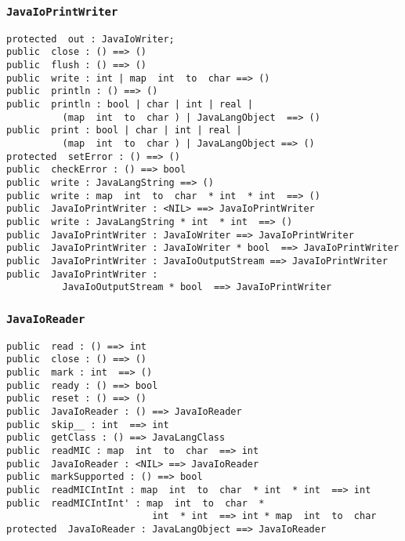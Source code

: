 \documentclass[\pformat,12pt]{article}
\begin{document}
\subsubsection{\texttt{JavaIoPrintWriter}}
\begin{small}
\begin{verbatim}
protected  out : JavaIoWriter;
public  close : () ==> ()
public  flush : () ==> ()
public  write : int | map  int  to  char ==> ()
public  println : () ==> ()
public  println : bool | char | int | real | 
          (map  int  to  char ) | JavaLangObject  ==> ()
public  print : bool | char | int | real | 
          (map  int  to  char ) | JavaLangObject ==> ()
protected  setError : () ==> ()
public  checkError : () ==> bool
public  write : JavaLangString ==> ()
public  write : map  int  to  char  * int  * int  ==> ()
public  JavaIoPrintWriter : <NIL> ==> JavaIoPrintWriter
public  write : JavaLangString * int  * int  ==> ()
public  JavaIoPrintWriter : JavaIoWriter ==> JavaIoPrintWriter
public  JavaIoPrintWriter : JavaIoWriter * bool  ==> JavaIoPrintWriter
public  JavaIoPrintWriter : JavaIoOutputStream ==> JavaIoPrintWriter
public  JavaIoPrintWriter : 
          JavaIoOutputStream * bool  ==> JavaIoPrintWriter
\end{verbatim}
\end{small}

\subsubsection{\texttt{JavaIoReader}}
\begin{small}
\begin{verbatim}
public  read : () ==> int
public  close : () ==> ()
public  mark : int  ==> ()
public  ready : () ==> bool
public  reset : () ==> ()
public  JavaIoReader : () ==> JavaIoReader
public  skip__ : int  ==> int
public  getClass : () ==> JavaLangClass
public  readMIC : map  int  to  char  ==> int
public  JavaIoReader : <NIL> ==> JavaIoReader
public  markSupported : () ==> bool
public  readMICIntInt : map  int  to  char  * int  * int  ==> int
public  readMICIntInt' : map  int  to  char  * 
                          int  * int  ==> int * map  int  to  char
protected  JavaIoReader : JavaLangObject ==> JavaIoReader
\end{verbatim}
\end{small}
\end{document}

